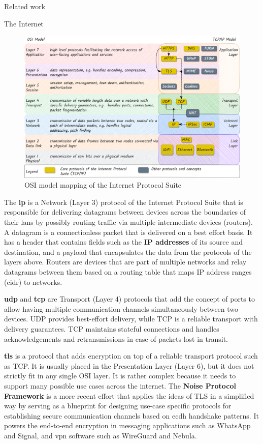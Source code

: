 \begin{frame}[fragile]{Related work}
\begin{block}{The Internet}
\begin{figure}
\centering
\includegraphics[width=\textwidth,height=0.5\textheight]{thesis/../figures/osi-map-tcp.png}
\caption{OSI model mapping of the Internet Protocol
Suite\label{osi-map-tcp}}
\end{figure}

The \textbf{\acrfull{ip}} is a Network (Layer 3) protocol of the
Internet Protocol Suite that is responsible for delivering datagrams
between devices across the boundaries of their \glspl{lan} by possibly
routing traffic via multiple intermediate devices (routers). A datagram
is a connectionless packet that is delivered on a best effort basis. It
has a header that contains fields such as the \textbf{IP addresses} of
its source and destination, and a payload that encapsulates the data
from the protocols of the layers above. Routers are devices that are
part of multiple networks and relay datagrams between them based on a
routing table that maps IP address ranges (\gls{cidr}) to networks.

\textbf{\acrfull{udp}} and \textbf{\acrfull{tcp}} are Transport (Layer
4) protocols that add the concept of ports to allow having multiple
communication channels simultaneously between two devices. UDP provides
best-effort delivery, while TCP is a reliable transport with delivery
guarantees. TCP maintains stateful connections and handles
acknowledgements and retransmissions in case of packets lost in transit.

\textbf{\acrfull{tls}} is a protocol that adds encryption on top of a
reliable transport protocol such as TCP. It is usually placed in the
Presentation Layer (Layer 6), but it does not strictly fit in any single
OSI layer. It is rather complex because it needs to support many
possible use cases across the internet.  The \textbf{Noise
Protocol Framework} \autocite{noiseDocs} is a more
 recent effort that applies the
ideas of TLS in a simplified way by serving as a blueprint for designing
use-case specific protocols for establishing secure communication
channels based on \gls{ecdh} handshake patterns. It powers the
end-to-end encryption in messaging applications such as WhatsApp and
Signal, and \gls{vpn} software such as WireGuard and Nebula.


\end{block}
\end{frame}
